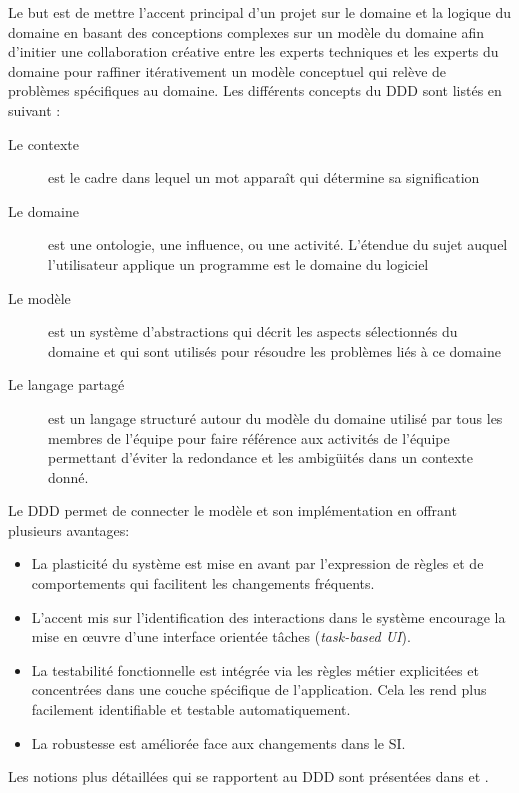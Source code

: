 	Le but est de mettre l'accent principal d'un projet sur le domaine et la logique du 
	domaine en basant des conceptions complexes sur un modèle du domaine afin 
	d'initier une collaboration créative entre les experts techniques et les experts du 
	domaine pour raffiner itérativement un modèle conceptuel qui relève de 
	problèmes 
	spécifiques au domaine.
	Les différents concepts du \gls{DDD} sont listés en suivant :
	\begin{description}
		\item[Le contexte] est le cadre dans lequel un mot apparaît qui détermine sa 
		signification
		\item[Le domaine] est une ontologie, une influence, ou une activité. 
		L'étendue du sujet auquel l'utilisateur applique un programme est le domaine 
		du logiciel 
		\item[Le modèle] est un système d'abstractions qui décrit les aspects 
		sélectionnés du domaine et qui sont utilisés pour résoudre les problèmes liés 
		à ce domaine
		\item[Le langage partagé] est un langage structuré autour du modèle du 
		domaine utilisé par tous les membres de l'équipe pour faire référence aux 
		activités de l'équipe permettant d'éviter la redondance et les ambigüités dans 
		un contexte donné.
	\end{description}
	Le \gls{DDD} permet de connecter le modèle et son implémentation en offrant 
	plusieurs avantages:
	\begin{itemize}
		\item La plasticité du système est mise en avant par l'expression de règles 
		et de comportements qui facilitent les changements fréquents.
		\item L'accent mis sur l'identification des interactions dans le système 
		encourage la mise en \oe{}uvre d'une interface orientée tâches 
		(\textit{task-based UI}).
		\item La testabilité fonctionnelle est intégrée via les règles métier explicitées 
		et concentrées dans une couche spécifique de l'application. Cela les rend 
		plus facilement identifiable et testable automatiquement.
		\item La robustesse est améliorée face aux changements dans le SI.
	\end{itemize}
	
	Les notions plus détaillées qui se rapportent au \gls{DDD} sont présentées dans 
	\cite{Evans2003} et \cite{Vernon2013}.
	
